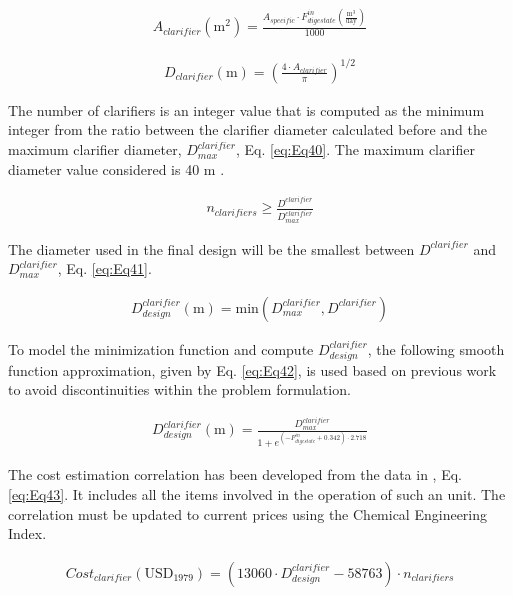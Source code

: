 \begin{refsection}[referencesCh2]
\begin{align}
	{A}_{clarifier} \left( \text{m}^2 \right) = \frac{A_{specific} \cdot F_{digestate}^{in}\left( \frac{\text{m}^3}{\text{day}} \right)}{1000} \label{eq:Eq38}
\end{align}

\begin{align}
	D_{clarifier} \left( \text{m} \right) = \left( \frac{4 \cdot A_{clarifier}}{\pi} \right)^{1/2} \label{eq:Eq39}
\end{align}

The number of clariﬁers is an integer value that is computed as the minimum integer from the ratio between the clariﬁer diameter calculated before and the maximum clariﬁer diameter, $D_{max}^{clarifier}$, Eq. \ref{eq:Eq40}. The maximum clariﬁer diameter value considered is 40 m \citep{green2008perry}.

\begin{align}
	{n}_{clarifiers} \ge \frac{D^{clarifier}}{D_{max}^{clarifier}} \label{eq:Eq40}
\end{align}

The diameter used in the ﬁnal design will be the smallest between $D^{clarifier}$ and $D_{max}^{clarifier}$, Eq. \ref{eq:Eq41}.

\begin{align}
	D_{design}^{clarifier} \left( \text{m} \right) = \text{min}(D_{max}^{clarifier},D^{clarifier}) \label{eq:Eq41}
\end{align}

To model the minimization function and compute $D_{design}^{clarifier}$, the following smooth function approximation, given by Eq. \ref{eq:Eq42}, is used based on previous work \citep{de2016characterization} to avoid discontinuities within the problem formulation.

\begin{align}
	D_{design}^{clarifier} \left( \text{m} \right) = \frac{D_{max}^{clarifier}}{1 + {e^{\left( -F_{digestate}^{in} + 0.342 \right) \cdot 2.718}}} \label{eq:Eq42}
\end{align}

The cost estimation correlation has been developed from the data in \citet{wef2005wef}, Eq. \ref{eq:Eq43}. It includes all the items involved in the operation of such an unit. The correlation must be updated to current prices using the Chemical Engineering Index.

\begin{align}
	Cost_{clarifier} \left( \text{USD}_{1979} \right) = \left( 13060 \cdot D_{design}^{clarifier} - 58763 \right) \cdot {n}_{clarifiers} \label{eq:Eq43}
\end{align}


\end{refsection}

